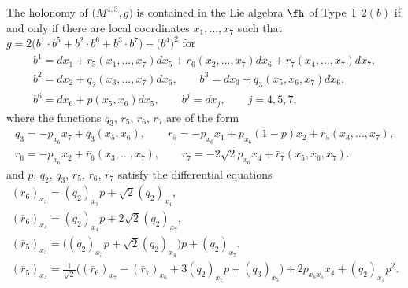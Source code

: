 \begin{Proposition} \label{prop2.2} The holonomy of $\big(M^{4,3},g\big)$ is contained in the Lie algebra $\fh$ of Type~I~$2(b)$ if and only if there are local coordinates $x_1,\dots,x_7$ such that $g=2\big(b^1\cdot b^5+b^2\cdot b^6+b^3\cdot b^7\big)- \big(b^4\big)^2$ for
\begin{gather}
b^1 = dx_1+r_5(x_1,\dots,x_7)dx_5+r_6(x_2,\dots,x_7)dx_6+r_7(x_4,\dots,x_7)dx_7, \nonumber \\
b^2 =dx_2+ q_2(x_3,\dots,x_7)dx_6, \qquad b^3 =dx_3+ q_3(x_5,x_6,x_7)dx_6, \label{Eb}\\
b^6 =dx_6+p(x_5,x_6)dx_5, \qquad b^j =dx_j, \qquad j=4,5,7, \nonumber
\end{gather}
where the functions $q_3$, $r_5$, $r_6$, $r_7$ are of the form
\begin{gather*}
q_3= -p_{x_6}x_7+\bar q_3(x_5,x_6),\qquad
r_5= -p_{x_6} x_1 +p_{x_6}(1-p)x_2+\bar r_5(x_3,\dots,x_7),\\
r_6= -p_{x_6}x_2 +\bar r_6(x_3,\dots, x_7),\qquad
r_7= -2\sqrt2 p_{x_6}x_4 +\bar r_7(x_5,x_6,x_7).
\end{gather*}
and $p$, $q_2$, $q_3$, $\bar r_5$, $\bar r_6$, $\bar r_7$ satisfy the differential equations
\begin{gather}
(\bar r_6)_{x_3}= (q_2)_{x_3}p+ {\sqrt2}(q_2)_{x_4}, \label{Esysta}\\
(\bar r_6)_{x_4}=(q_2)_{x_4}p+2\sqrt 2(q_2)_{x_7},\label{Esyst2}\\
(\bar r_5)_{x_3} =\big((q_2)_{x_3}p+ {\sqrt2}(q_2)_{x_4}\big)p+ (q_2)_{x_7}, \label{Esyst3}\\
(\bar r_5)_{x_4}= \tfrac 1{\sqrt2} \big((\bar r_6)_{x_7} - (\bar r_7)_{x_6} +3 (q_2)_{x_7}p +(q_3)_{x_5}\big) +2p_{x_6 x_6} x_4 +(q_2)_{x_4} p^2.\label{Esyste}
\end{gather}
\end{Proposition}
